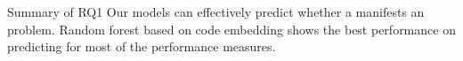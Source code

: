 



\vspace{0.5cm}
\begin{Summary}{Summary of RQ1}{}
Our models can effectively predict whether a \instance manifests an \inconsistent problem. Random forest based on code embedding shows the best performance on predicting \inconsistent for most of the performance measures.
\end{Summary}


